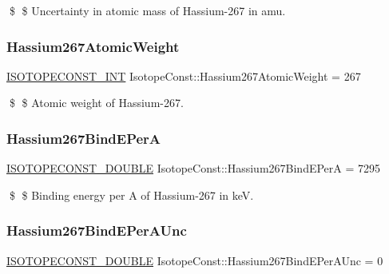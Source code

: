 \$ \$ Uncertainty in atomic mass of Hassium-\/267 in amu. \mbox{\label{group___isotope_const-_hassium-_hs267_ga9fd97051fce1b83e81818caf479d4a43}} 
\subsubsection{\texorpdfstring{Hassium267\+Atomic\+Weight}{Hassium267AtomicWeight}}
{\footnotesize\ttfamily \mbox{\hyperlink{group___isotope_const-_macros_ga5f18360b3e99483a35c32d789e62621c}{I\+S\+O\+T\+O\+P\+E\+C\+O\+N\+S\+T\+\_\+\+I\+NT}} Isotope\+Const\+::\+Hassium267\+Atomic\+Weight = 267}

\$ \$ Atomic weight of Hassium-\/267. \mbox{\label{group___isotope_const-_hassium-_hs267_ga39102623f5e80fd449155f66888999de}} 
\subsubsection{\texorpdfstring{Hassium267\+Bind\+E\+PerA}{Hassium267BindEPerA}}
{\footnotesize\ttfamily \mbox{\hyperlink{group___isotope_const-_macros_ga8f45a7272ce02c0b4c65c44636ed719a}{I\+S\+O\+T\+O\+P\+E\+C\+O\+N\+S\+T\+\_\+\+D\+O\+U\+B\+LE}} Isotope\+Const\+::\+Hassium267\+Bind\+E\+PerA = 7295}

\$ \$ Binding energy per A of Hassium-\/267 in keV. \mbox{\label{group___isotope_const-_hassium-_hs267_ga3af67fba00c0498549e1b9245f76b3a4}} 
\subsubsection{\texorpdfstring{Hassium267\+Bind\+E\+Per\+A\+Unc}{Hassium267BindEPerAUnc}}
{\footnotesize\ttfamily \mbox{\hyperlink{group___isotope_const-_macros_ga8f45a7272ce02c0b4c65c44636ed719a}{I\+S\+O\+T\+O\+P\+E\+C\+O\+N\+S\+T\+\_\+\+D\+O\+U\+B\+LE}} Isotope\+Const\+::\+Hassium267\+Bind\+E\+Per\+A\+Unc = 0}

